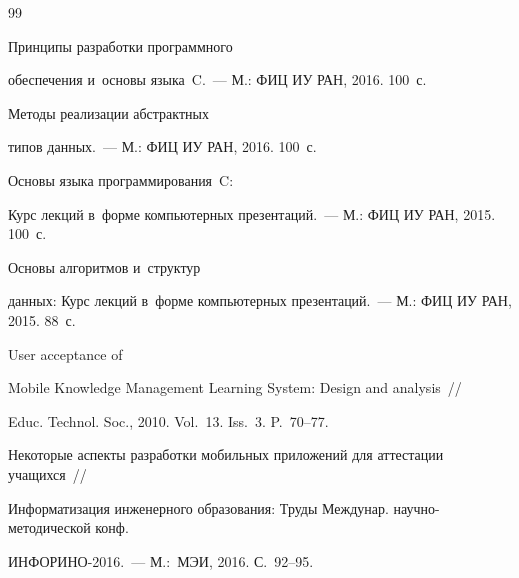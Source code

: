 {{\begin{thebibliography}{99}


 Принципы разработки программного 


обеспечения и~основы языка~C.~--- М.: ФИЦ ИУ РАН, 2016. 100~с.







 Методы реализации абстрактных 


типов данных.~--- М.: ФИЦ ИУ РАН, 2016. 100~с.







  Основы языка программирования~C: 


Курс лекций в~форме компьютерных презентаций.~--- М.: ФИЦ ИУ РАН, 2015. 100~с.







 Основы алгоритмов и~структур 


данных: Курс лекций в~форме компьютерных презентаций.~--- М.: ФИЦ ИУ РАН, 2015. 88~с.













 User acceptance of 


Mobile Knowledge Management Learning System: Design and analysis~/\!\!/ 


Educ. Technol.  Soc., 2010. Vol.~13. Iss.~3. P.~70--77.









Некоторые аспекты разработки мобильных приложений для аттестации учащихся~/\!\!/ 


Информатизация инженерного образования: Труды Междунар. на\-уч\-но-методической конф. 


ИНФОРИНО-2016.~--- М.:~МЭИ, 2016. С.~92--95.






\end{thebibliography}}}
